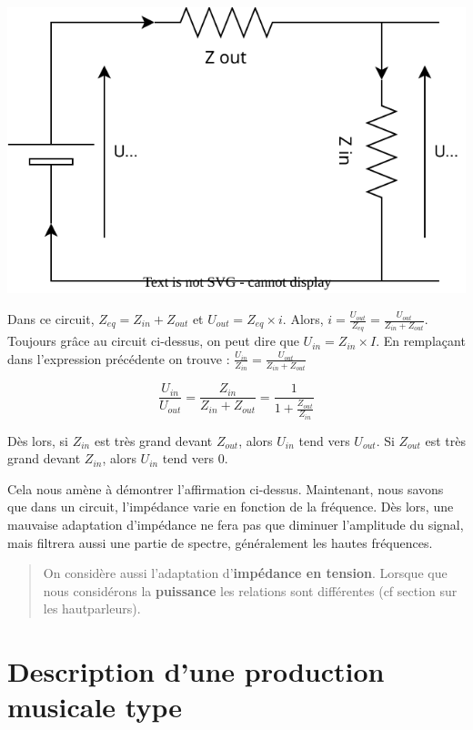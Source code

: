 \documentclass[
]{book}
\begin{document}
\begin{center}\includegraphics{_resources/diagrams/impedance} \end{center}

Dans ce circuit, \(Z_{eq} = Z_{in} + Z_{out}\) et \(U_{out} = Z_{eq} \times i\). Alors, \(i = \frac{U_{out}}{Z_{eq}} = \frac{U_{out}}{Z_{in} + Z_{out}}\). Toujours grâce au circuit ci-dessus, on peut dire que \(U_{in} = Z_{in} \times I\). En remplaçant dans l'expression précédente on trouve : \(\frac{U_{in}}{Z_{in}} = \frac{U_{out}}{Z_{in} + Z_{out}}\)

\[ \frac{U_{in}}{U_{out}} = \frac{Z_{in}}{Z_{in} + Z_{out}} = \frac{1}{1+\frac{Z_{out}}{Z_{in}}} \]

Dès lors, si \(Z_{in}\) est très grand devant \(Z_{out}\), alors \(U_{in}\) tend vers \(U_{out}\). Si \(Z_{out}\) est très grand devant \(Z_{in}\), alors \(U_{in}\) tend vers \(0\).

Cela nous amène à démontrer l'affirmation ci-dessus. Maintenant, nous savons que dans un circuit, l'impédance varie en fonction de la fréquence. Dès lors, une mauvaise adaptation d'impédance ne fera pas que diminuer l'amplitude du signal, mais filtrera aussi une partie de spectre, généralement les hautes fréquences.

\begin{quote}
On considère aussi l'adaptation d'\textbf{impédance en tension}. Lorsque que nous considérons la \textbf{puissance} les relations sont différentes (cf section sur les hautparleurs).
\end{quote}

\hypertarget{description-dune-production-musicale-type}{%
\chapter{Description d'une production musicale type}\label{description-dune-production-musicale-type}}
\end{document}
